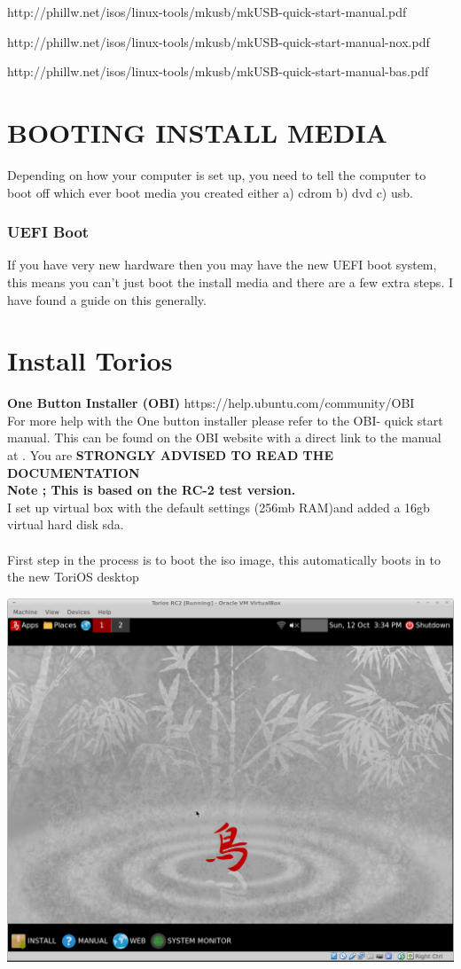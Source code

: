 \documentclass[12pt,a4paper]{book}
\begin{document}
http://phillw.net/isos/linux-tools/mkusb/mkUSB-quick-start-manual.pdf

http://phillw.net/isos/linux-tools/mkusb/mkUSB-quick-start-manual-nox.pdf

http://phillw.net/isos/linux-tools/mkusb/mkUSB-quick-start-manual-bas.pdf

\newpage 

\chapter{BOOTING INSTALL MEDIA}

Depending on how your computer is set up,  you need to tell the computer to boot off which ever boot media you created either a) cdrom b) dvd c) usb. \\

\subsection{UEFI Boot}
If you have very new hardware then you may have the new UEFI boot system,  this means you can't just boot the install media and there are a few extra steps. I have found a guide \cite{UEFILinux} on this generally. 
\newpage

\chapter{Install Torios}
\textbf{One Button Installer (OBI) }
https://help.ubuntu.com/community/OBI\\
For more help with the One button installer please refer to the OBI- quick start manual. This can be found on the OBI website \cite{OBI} with a direct link to the manual at \cite{OBI Quickstart}. You are \textbf{STRONGLY ADVISED TO READ THE DOCUMENTATION}
\\
\textbf{Note ; This is based on the RC-2 test version.}
\linebreak \\
I set up virtual box with the default settings (256mb RAM)and added a 16gb virtual hard disk sda. \\
\\
First step in the process is to boot the iso image,  this automatically boots in to the new ToriOS desktop

\includegraphics[width=0.7\linewidth]{toriosRC2} 
\\
\end{document}
